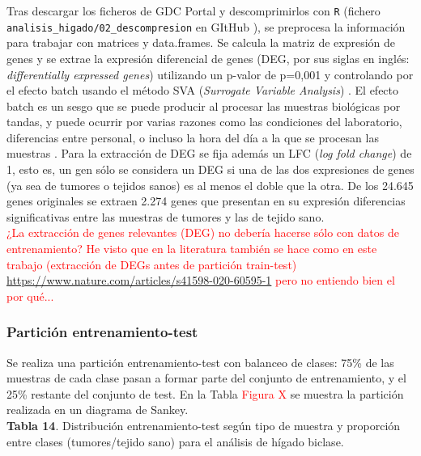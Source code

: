 Tras descargar los ficheros de GDC Portal y descomprimirlos con \texttt{R} (fichero \texttt{analisis\_higado/02\_descompresion}  en GItHub \cite{Redondo-Sanchez2020}), se preprocesa la información para trabajar con matrices y data.frames. Se calcula la matriz de expresión de genes y se extrae la expresión diferencial de genes (DEG, por sus siglas en inglés: \textit{differentially expressed genes}) utilizando un p-valor de p=0,001 y controlando por el efecto batch usando el método SVA (\textit{Surrogate Variable Analysis}) \cite{Leek2012}. El efecto batch es un sesgo que se puede producir al procesar las muestras biológicas por tandas, y puede ocurrir por varias razones como las condiciones del laboratorio, diferencias entre personal, o incluso la hora del día a la que se procesan las muestras \cite{Goh2017, Leek2010}. Para la extracción de DEG se fija además un LFC (\textit{log fold change}) de 1, esto es, un gen sólo se considera un DEG si una de las dos expresiones de genes (ya sea de tumores o tejidos sanos) es al menos el doble que la otra. De los 24.645 genes originales se extraen 2.274 genes que presentan en su expresión diferencias significativas entre las muestras de tumores y las de tejido sano.\\

\textcolor{red}{¿La extracción de genes relevantes (DEG) no debería hacerse sólo con datos de entrenamiento? He visto que en la literatura también se hace como en este trabajo (extracción de DEGs antes de partición train-test) \url{https://www.nature.com/articles/s41598-020-60595-1} pero no entiendo bien el por qué...}\\

\subsubsection{Partición entrenamiento-test}

Se realiza una partición entrenamiento-test con balanceo de clases: 75\% de las muestras de cada clase pasan a formar parte del conjunto de entrenamiento, y el 25\% restante del conjunto de test. En la Tabla \textcolor{red}{Figura X} se muestra la partición realizada en un diagrama de Sankey.\\

\textbf{Tabla 14}. Distribución entrenamiento-test según tipo de muestra y proporción entre clases (tumores/tejido sano) para el análisis de hígado biclase.\\

